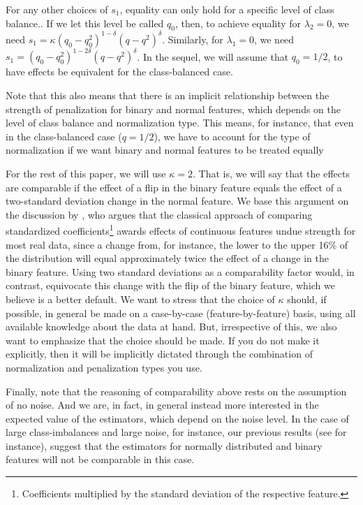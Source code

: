 For any other choices of \(s_1\), equality can only hold for a specific level of class balance.. If we let this level be called \(q_0\), then, to achieve equality for \(\lambda_2 = 0\), we need \(s_1 =\kappa (q_0 - q_0^2)^{1 - \delta}(q - q^2)^\delta\). Similarly, for \(\lambda_1 = 0\), we need \(s_1 = (q_0 - q_0^2)^{1 - 2\delta} (q - q^2)^\delta\). In the sequel, we will assume that \(q_0 = 1/2\), to have effects be equivalent for the class-balanced case.

Note that this also means that there is an implicit relationship between the strength of penalization for binary and normal features, which depends on the level of class balance and normalization type. This means, for instance, that even in the class-balanced case (\(q = 1/2\)), we have to account for the type of normalization if we want binary and normal features to be treated equally

For the rest of this paper, we will use \(\kappa = 2\). That is, we will say that the effects are comparable if the effect of a flip in the binary feature equals the effect of a two-standard deviation change in the normal feature. We base this argument on the discussion by \citet{gelman2008}, who argues that the classical approach of comparing standardized coefficients\footnote{Coefficients multiplied by the standard deviation of the respective feature.} awards effects of continuous features undue strength for most real data, since a change from, for instance, the lower to the upper 16\% of the distribution will equal approximately twice the effect of a change in the binary feature. Using two standard deviations as a comparability factor would, in contrast, equivocate this change with the flip of the binary feature, which we believe is a better default.
We want to stress that the choice of \(\kappa\) should, if possible, in general be made on a case-by-case (feature-by-feature) basis, using all available knowledge about the data at hand. But, irrespective of this, we also want to emphasize that the choice should be made. If you do not make it explicitly, then it will be implicitly dictated through the combination of normalization and penalization types you use.

Finally, note that the reasoning of comparability above rests on the assumption of no noise.
And we are, in fact, in general instead more interested in the expected value of the estimators, which depend on the noise level. In the case of large class-imbalances and large noise, for instance, our previous results (see  for instance), suggest that the estimators for normally distributed and binary features will not be comparable in this case.



